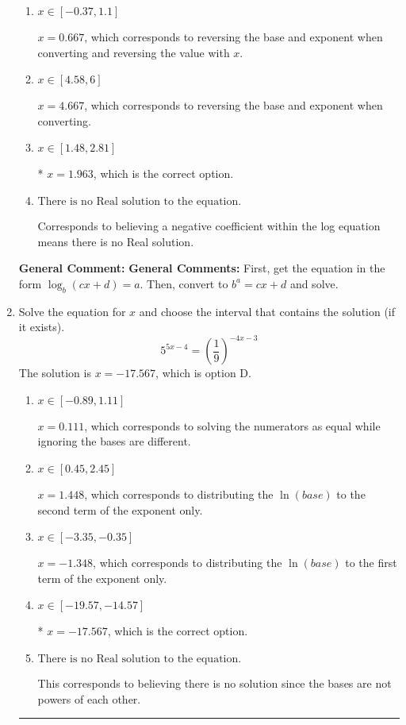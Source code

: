 \documentclass{extbook}[14pt]
\newcommand{\litem}[1]{\item #1

\rule{\textwidth}{0.4pt}}
\begin{document}
\begin{enumerate}
{\begin{enumerate}[label=\Alph*.]
$x = -1.000$, which corresponds to ignoring the vertical shift when converting to exponential form.
\item \( x \in [-0.37, 1.1] \)

$x = 0.667$, which corresponds to reversing the base and exponent when converting and reversing the value with $x$.
\item \( x \in [4.58, 6] \)

$x = 4.667$, which corresponds to reversing the base and exponent when converting.
\item \( x \in [1.48, 2.81] \)

* $x = 1.963$, which is the correct option.
\item \( \text{There is no Real solution to the equation.} \)

Corresponds to believing a negative coefficient within the log equation means there is no Real solution.
\end{enumerate}

\textbf{General Comment:} \textbf{General Comments:} First, get the equation in the form $\log_b{(cx+d)} = a$. Then, convert to $b^a = cx+d$ and solve.
}
\litem{
Solve the equation for $x$ and choose the interval that contains the solution (if it exists).
\[ 5^{5x-4} = \left(\frac{1}{9}\right)^{-4x-3} \]The solution is \( x = -17.567 \), which is option D.\begin{enumerate}[label=\Alph*.]
\item \( x \in [-0.89, 1.11] \)

$x = 0.111$, which corresponds to solving the numerators as equal while ignoring the bases are different.
\item \( x \in [0.45, 2.45] \)

$x = 1.448$, which corresponds to distributing the $\ln(base)$ to the second term of the exponent only.
\item \( x \in [-3.35, -0.35] \)

$x = -1.348$, which corresponds to distributing the $\ln(base)$ to the first term of the exponent only.
\item \( x \in [-19.57, -14.57] \)

* $x = -17.567$, which is the correct option.
\item \( \text{There is no Real solution to the equation.} \)

This corresponds to believing there is no solution since the bases are not powers of each other.
\end{enumerate}

}
\end{enumerate}
\end{document}
